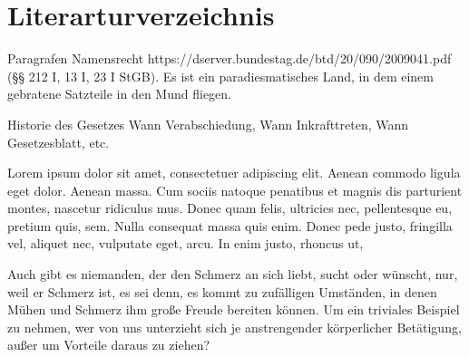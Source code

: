 \documentclass{jura}
\renewcommand*{\mainmatter}{\cleardoublepage\pagenumbering{arabic}}
\begin{document}
	\makeatletter
	\renewcommand\tableofcontents{%
		\@starttoc{toc}}
	\makeatother
	
	\tableofcontents
	
	\newpage
	
	\section*{Literarturverzeichnis}
	
	\renewcommand{\bibname}{}
	\renewcommand{\chapter}[1]{}
	
	
	
	\newpage
	
	
	\mainmatter
	
	\boldmath
	\restoregeometry
	
	
	
	Paragrafen
	Namensrecht
	https://dserver.bundestag.de/btd/20/090/2009041.pdf
	(§§ 212 I, 13 I, 23 I StGB). Es ist ein paradiesmatisches Land, in dem einem gebratene Satzteile in den Mund fliegen. 
	
	

	
	Historie des Gesetzes
	Wann Verabschiedung, Wann Inkrafttreten, Wann Gesetzesblatt, etc.
	
	
	Lorem ipsum dolor sit amet, consectetuer adipiscing elit. Aenean commodo ligula eget dolor. Aenean massa. Cum sociis natoque penatibus et magnis dis parturient montes, nascetur ridiculus mus. Donec quam felis, ultricies nec, pellentesque eu, pretium quis, sem. Nulla consequat massa quis enim. Donec pede justo, fringilla vel, aliquet nec, vulputate eget, arcu. In enim justo, rhoncus ut, 
	
	
	Auch gibt es niemanden, der den Schmerz an sich liebt, sucht oder wünscht, nur, weil er Schmerz ist, es sei denn, es kommt zu zufälligen Umständen, in denen Mühen und Schmerz ihm große Freude bereiten können. Um ein triviales Beispiel zu nehmen, wer von uns unterzieht sich je anstrengender körperlicher Betätigung, außer um Vorteile daraus zu ziehen? 
	
\end{document}
